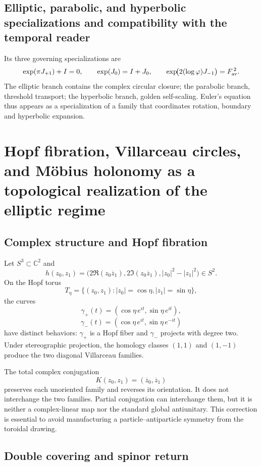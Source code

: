 \subsection{Elliptic, parabolic, and hyperbolic specializations and compatibility with the temporal reader}

Its three governing specializations are
\begin{equation}\label{p12-83-c11-s1:eq:constantes-euler-tres-ramas}
 \exp(\pi J_{+1})+I=0,\qquad
 \exp(J_0)=I+J_0,\qquad
 \exp\!\bigl(2(\log\varphi)J_{-1}\bigr)=F_{\rm av}^{\,2}.
\end{equation}
The elliptic branch contains the complex circular closure; the parabolic branch,
threshold transport; the hyperbolic branch, golden self-scaling. Euler’s equation
thus appears as a specialization of a family that coordinates rotation,
boundary and hyperbolic expansion.


\section{Hopf fibration, Villarceau circles, and Möbius holonomy as a topological realization of the elliptic regime}

\subsection{Complex structure and Hopf fibration}

Let \(S^3\subset\mathbb C^2\) and
\[
h(z_0,z_1)=
\bigl(2\Re(z_0\overline z_1),
2\Im(z_0\overline z_1),|z_0|^2-|z_1|^2\bigr)
\in S^2.
\]
On the Hopf torus
\[
T_\eta=\{(z_0,z_1):|z_0|=\cos\eta,
|z_1|=\sin\eta\},
\]
the curves
\[
\gamma_+(t)=(\cos\eta\,e^{it},\sin\eta\,e^{it}),
\]
\[
\gamma_-(t)=(\cos\eta\,e^{it},\sin\eta\,e^{-it})
\]
have distinct behaviors: \(\gamma_+\) is a Hopf fiber and
\(\gamma_-\) projects with degree two. Under stereographic projection, the
homology classes \((1,1)\) and \((1,-1)\) produce the two diagonal
Villarceau families.

The total complex conjugation
\[
K(z_0,z_1)=(\overline z_0,\overline z_1)
\]
preserves each unoriented family and reverses its orientation. It does not interchange
the two families. Partial conjugation can interchange them, but it is neither a
complex-linear map nor the standard global antiunitary. This correction
is essential to avoid manufacturing a particle--antiparticle symmetry from the
toroidal drawing.

\subsection{Double covering and spinor return}

